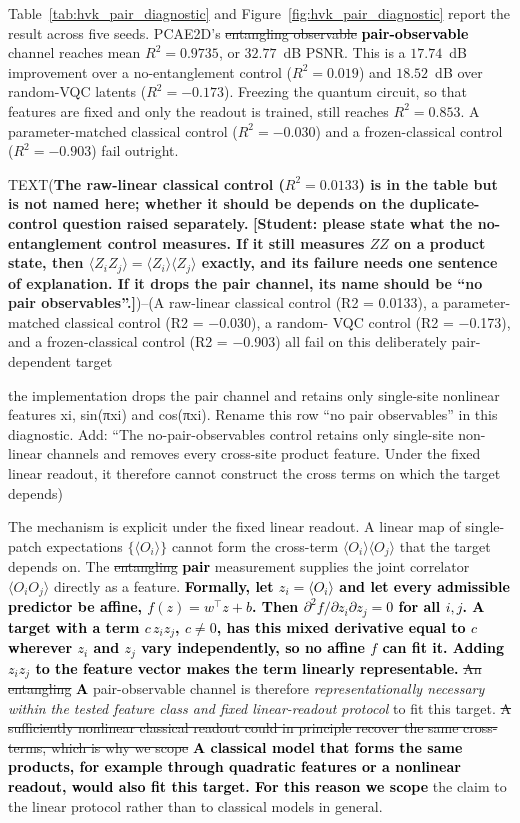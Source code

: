 \documentclass[pdflatex,sn-basic]{sn-jnl}
\newcommand{\del}[1]{\sout{#1}}
\newcommand{\add}[1]{\textbf{\textcolor{black}{#1}}}
\begin{document}
Table~\ref{tab:hvk_pair_diagnostic} and Figure~\ref{fig:hvk_pair_diagnostic}
report the result across five seeds. PCAE2D's \del{entangling observable}
\add{pair-observable} channel
reaches mean $R^2=0.9735$, or $32.77$~dB PSNR. This is a $17.74$~dB improvement
over a no-entanglement control ($R^2=0.019$) and $18.52$~dB over random-VQC
latents ($R^2=-0.173$). Freezing the quantum circuit, so that features are fixed
and only the readout is trained, still reaches $R^2=0.853$. A parameter-matched
classical control ($R^2=-0.030$) and a frozen-classical control ($R^2=-0.903$)
fail outright. 

TEXT({\color{red}\textbf{The raw-linear classical control
($R^2=0.0133$) is in the table but is not named here; whether it should be
depends on the duplicate-control question raised separately.}}
{\color{red}\textbf{[Student: please state what the no-entanglement control
measures. If it still measures $ZZ$ on a product state, then
$\langle Z_iZ_j\rangle=\langle Z_i\rangle\langle Z_j\rangle$ exactly, and its
failure needs one sentence of explanation. If it drops the pair channel, its
name should be ``no pair observables''.]}})--(A raw-linear classical control
(R2 = 0.0133), a parameter-matched classical control (R2 = −0.030), a random-
VQC control (R2 = −0.173), and a frozen-classical control (R2 = −0.903) all fail on
this deliberately pair-dependent target



the implementation drops the pair channel and retains only single-site
nonlinear features xi, sin(πxi) and cos(πxi). Rename this row “no pair observables”
in this diagnostic. Add: “The no-pair-observables control retains only single-site non-
linear channels and removes every cross-site product feature. Under the fixed linear
readout, it therefore cannot construct the cross terms on which the target depends)

The mechanism is explicit under the fixed linear readout. A linear map of
single-patch expectations $\{\langle O_i\rangle\}$ cannot form the cross-term
$\langle O_i\rangle\langle O_j\rangle$ that the target depends on. The \del{entangling}
\add{pair} measurement supplies the joint correlator $\langle O_iO_j\rangle$ directly as a
feature. \add{Formally, let $z_i=\langle O_i\rangle$ and let every admissible
predictor be affine, $f(z)=w^{\top}z+b$. Then
$\partial^2 f/\partial z_i\partial z_j=0$ for all $i,j$. A target with a term
$c\,z_iz_j$, $c\neq0$, has this mixed derivative equal to $c$ wherever $z_i$ and
$z_j$ vary independently, so no affine $f$ can fit it. Adding $z_iz_j$ to the
feature vector makes the term linearly representable.} \del{An entangling}
\add{A} pair-observable channel is therefore
\emph{representationally necessary within the tested feature class and fixed
linear-readout protocol} to fit this target. \del{A sufficiently nonlinear classical
readout could in principle recover the same cross-terms, which is why we scope}
\add{A classical model that forms the same products, for example through
quadratic features or a nonlinear readout, would also fit this target. For this
reason we scope} the claim to the linear protocol rather than to classical models in general.
\end{document}
